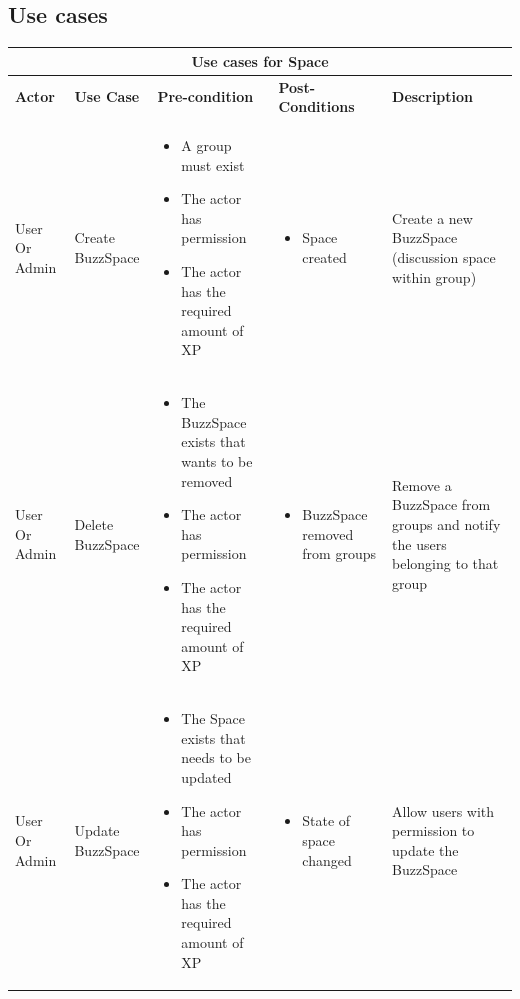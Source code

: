 \documentclass{article}
\begin{document}
	\subsection{Use cases}
	\newpage
	\begin{longtable}{@{}|p{1.5cm}|p{2.2cm}|p{3cm}|p{3.5cm}|p{3.5cm}|@{}}
		\toprule
		\multicolumn{5}{|c|}{\textbf{Use cases for Space}}\\
		\hline
		\textbf{Actor} & \textbf{Use Case} & \textbf{Pre-condition} & \textbf{Post-Conditions} & \textbf{Description} \\ \midrule
		
		User Or Admin& 
		Create BuzzSpace& 
		\begin{itemize}
			\item A group must exist
			\item The actor has permission
			\item The actor has the required amount of XP
		\end{itemize}& 
		\begin{itemize}
			\item Space created
		\end{itemize} & 
		Create a new BuzzSpace (discussion space within group) \\ \midrule
		
		User Or Admin& 
		Delete BuzzSpace& 
		\begin{itemize}
			\item The BuzzSpace exists that wants to be removed
			\item The actor has permission
			\item The actor has the required amount of XP
		\end{itemize}& 
		\begin{itemize}
			\item BuzzSpace removed from groups
		\end{itemize} & 
		Remove a BuzzSpace from groups and notify the users belonging to that group \\ \midrule
		
		User Or Admin& 
		Update BuzzSpace& 
		\begin{itemize}
			\item The Space exists that needs to be updated
			\item The actor has permission
			\item The actor has the required amount of XP
		\end{itemize}& 
		\begin{itemize}
			\item State of space changed
		\end{itemize} & 
		Allow users with permission to update the BuzzSpace \\ \midrule
		

\end{longtable}
\end{document}
